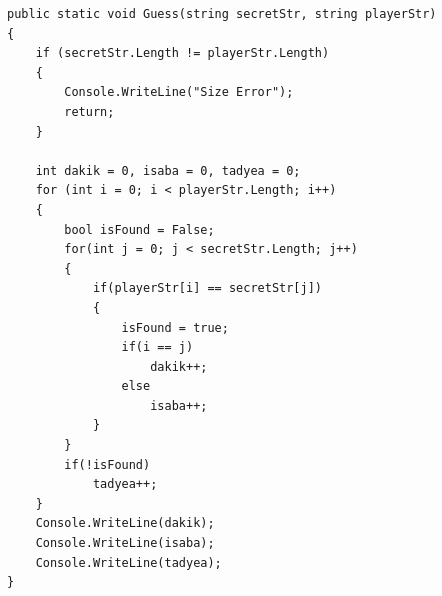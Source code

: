 \begin{boxSolution}
\begin{boxCode}
\begin{english}
\begin{verbatim}
public static void Guess(string secretStr, string playerStr)
{
    if (secretStr.Length != playerStr.Length)
    {
        Console.WriteLine("Size Error");
        return;
    }

    int dakik = 0, isaba = 0, tadyea = 0;
    for (int i = 0; i < playerStr.Length; i++)
    {
        bool isFound = False;
        for(int j = 0; j < secretStr.Length; j++)
        {
            if(playerStr[i] == secretStr[j])
            {
                isFound = true;
                if(i == j)
                    dakik++;
                else
                    isaba++;
            }
        }
        if(!isFound)
            tadyea++;
    }
    Console.WriteLine(dakik);
    Console.WriteLine(isaba);
    Console.WriteLine(tadyea);
}
\end{verbatim}
\end{english}
\end{boxCode}
\end{boxSolution}
\clearpage
\fi
